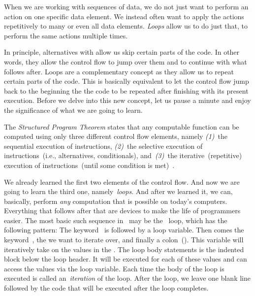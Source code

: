 %
%
When we are working with sequences of data, we do not just want to perform an action on one specific data element.
We instead often want to apply the actions repetitively to many or even all data elements.
\emph{Loops} allow us to do just that, to perform the same actions multiple times.

In principle, alternatives with  allow us skip certain parts of the code.
In other words, they allow the control flow to jump over them and to continue with what follows after.
Loops are a complementary concept as they allow us to repeat certain parts of the code.
This is basically equivalent to let the control flow jump back to the beginning the the code to be repeated after finishing with its present execution.
Before we delve into this new concept, let us pause a minute and enjoy the significance of what we are going to learn.%
%
\begin{definition}%
The \emph{Structured Program Theorem} states that any computable function can be computed using only three different control flow elements, namely \emph{(1)}~the sequential execution of instructions, \emph{(2)}~the selective execution of instructions~(i.e., alternatives, conditionals), and~\emph{(3)}~the iterative~(repetitive) execution of instructions~(until some condition is met)~\cite{B1964OAFOTMATRPL,BJ1966FDTMALWOTFR,S2011C1GIICS:TBJTAAITSPWP,H1980OFT}.%
\end{definition}%
%
We already learned the first two elements of the control flow.
And now we are going to learn the third one, namely~\emph{loops}.
And after we learned it, we can, basically, perform \emph{any} computation that is possible on today's computers.
Everything that follows after that are devices to make the life of programmers easier.%
%
%
%
%
%
%
The most basic such sequence in \python\ may be the ~loop, which has the following pattern\cite{PSF:P3D:TPT:MCFT}:%
%
%
\FloatBarrier%
%
%
%
%
%
%
%
The keyword~ is followed by a loop variable.
Then comes the keyword~, the  we want to iterate over, and finally a colon~(\pythonilIdx{:}).
This variable will iteratively take on the values in the .
The loop body statements is the indented block below the loop header.
It will be executed for each of these values and can access the values via the loop variable.
Each time the body of the loop is executed is called an~\emph{iteration} of the loop.
After the loop, we leave one blank line followed by the code that will be executed after the loop completes.

